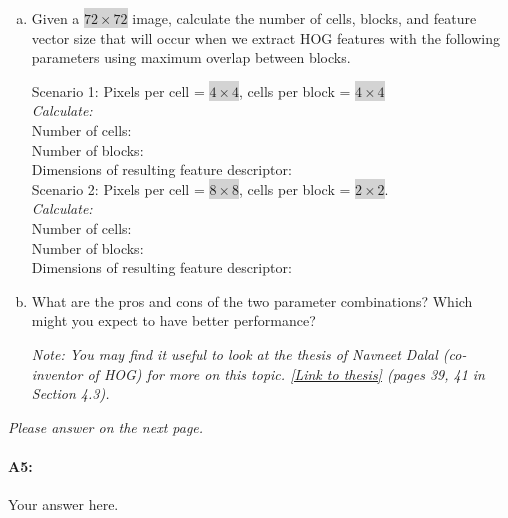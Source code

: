 \begin{enumerate}[(a)]
\item Given a \colorbox{lightgray}{$72\times72$} image, calculate the number of cells, blocks, and feature vector size that will occur when we extract HOG features with the following parameters using maximum overlap between blocks.

Scenario 1: Pixels per cell = \colorbox{lightgray}{$4\times4$}, cells per block = \colorbox{lightgray}{$4\times4$} %
\\
\emph{Calculate:}
\\ 
Number of cells: 
\\
Number of blocks: 
\\
Dimensions of resulting feature descriptor: 
\\

Scenario 2: Pixels per cell = \colorbox{lightgray}{$8\times8$}, cells per block = \colorbox{lightgray}{$2\times2$}.
\\
\emph{Calculate:}
\\ 
Number of cells:
\\
Number of blocks: 
\\
Dimensions of resulting feature descriptor: 


\item What are the pros and cons of the two parameter combinations? Which might you expect to have better performance?

\emph{Note: You may find it useful to look at the thesis of Navneet Dalal (co-inventor of HOG) for more on this topic. \href{http://lear.inrialpes.fr/people/dalal/NavneetDalalThesis.pdf}{[Link to thesis]} (pages 39, 41 in Section 4.3).}

\end{enumerate}

\emph{Please answer on the next page.}


\pagebreak
\paragraph{A5:} Your answer here.



